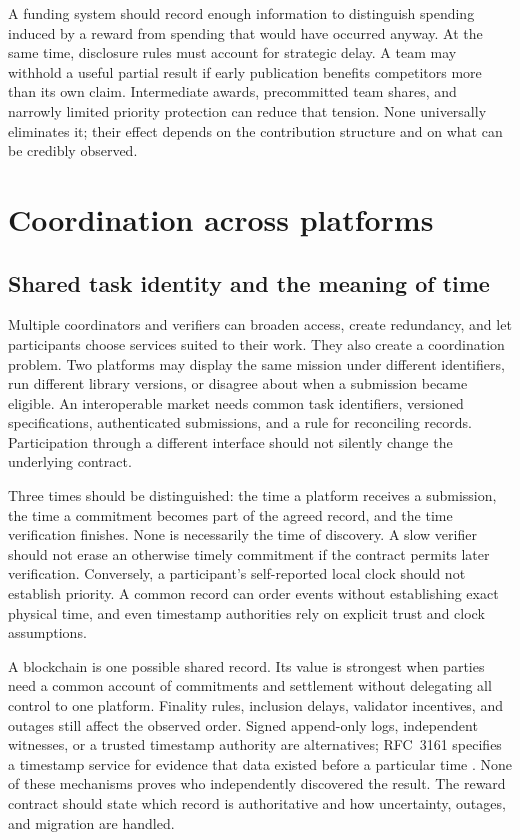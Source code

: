 \documentclass[11pt,a4paper]{article}
\begin{document}
A funding system should record enough information to distinguish spending induced by a reward from spending that would have occurred anyway. At the same time, disclosure rules must account for strategic delay. A team may withhold a useful partial result if early publication benefits competitors more than its own claim. Intermediate awards, precommitted team shares, and narrowly limited priority protection can reduce that tension. None universally eliminates it; their effect depends on the contribution structure and on what can be credibly observed.

\section{Coordination across platforms}
\label{sec:coordination}
\subsection{Shared task identity and the meaning of time}
Multiple coordinators and verifiers can broaden access, create redundancy, and let participants choose services suited to their work. They also create a coordination problem. Two platforms may display the same mission under different identifiers, run different library versions, or disagree about when a submission became eligible. An interoperable market needs common task identifiers, versioned specifications, authenticated submissions, and a rule for reconciling records. Participation through a different interface should not silently change the underlying contract.

Three times should be distinguished: the time a platform receives a submission, the time a commitment becomes part of the agreed record, and the time verification finishes. None is necessarily the time of discovery. A slow verifier should not erase an otherwise timely commitment if the contract permits later verification. Conversely, a participant's self-reported local clock should not establish priority. A common record can order events without establishing exact physical time, and even timestamp authorities rely on explicit trust and clock assumptions.

A blockchain is one possible shared record. Its value is strongest when parties need a common account of commitments and settlement without delegating all control to one platform. Finality rules, inclusion delays, validator incentives, and outages still affect the observed order. Signed append-only logs, independent witnesses, or a trusted timestamp authority are alternatives; RFC~3161 specifies a timestamp service for evidence that data existed before a particular time \citep{rfc3161}. None of these mechanisms proves who independently discovered the result. The reward contract should state which record is authoritative and how uncertainty, outages, and migration are handled.
\end{document}
